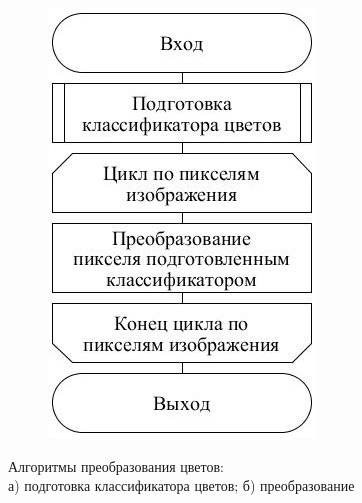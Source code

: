\documentclass[t]{beamer}
\begin{document}
\begin{frame}
\begin{figure}[ht!]
\begin{subfigure}{.2\textwidth}
				\includegraphics[width = \textwidth]{image/chapter_2/colorclassification2}
				\vspace*{-0.6cm}
				\caption{}
			\end{subfigure}
			\centering
			\vspace*{-0.3cm}
			\caption{Алгоритмы преобразования цветов:\\ а) подготовка классификатора цветов; б) преобразование}
			\label{fig:Examples}
		\end{figure}
		
	\end{frame}
\end{document}
